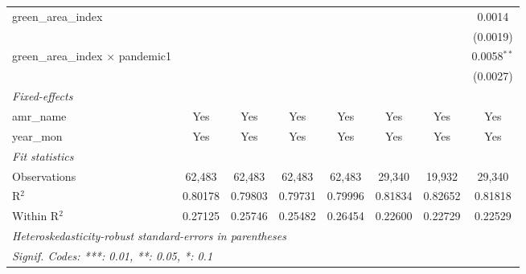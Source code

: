 \begin{table}[htbp]
\begin{tabular}{lccccccc}
      green\_area\_index                         &                         &                         &                         &                         &                &                 & 0.0014\\   
                                                 &                         &                         &                         &                         &                &                 & (0.0019)\\   
      green\_area\_index $\times$ pandemic1      &                         &                         &                         &                         &                &                 & 0.0058$^{**}$\\   
                                                 &                         &                         &                         &                         &                &                 & (0.0027)\\   
      \midrule
      \emph{Fixed-effects}\\
      amr\_name                                  & Yes                     & Yes                     & Yes                     & Yes                     & Yes            & Yes             & Yes\\  
      year\_mon                                  & Yes                     & Yes                     & Yes                     & Yes                     & Yes            & Yes             & Yes\\  
      \midrule
      \emph{Fit statistics}\\
      Observations                               & 62,483                  & 62,483                  & 62,483                  & 62,483                  & 29,340         & 19,932          & 29,340\\  
      R$^2$                                      & 0.80178                 & 0.79803                 & 0.79731                 & 0.79996                 & 0.81834        & 0.82652         & 0.81818\\  
      Within R$^2$                               & 0.27125                 & 0.25746                 & 0.25482                 & 0.26454                 & 0.22600        & 0.22729         & 0.22529\\  
      \midrule \midrule
      \multicolumn{8}{l}{\emph{Heteroskedasticity-robust standard-errors in parentheses}}\\
      \multicolumn{8}{l}{\emph{Signif. Codes: ***: 0.01, **: 0.05, *: 0.1}}\\
   \end{tabular}
\end{table}



